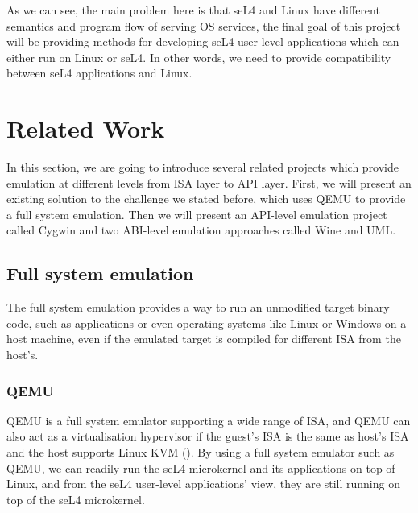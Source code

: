 As we can see, the main problem here is that seL4 and Linux have different semantics and program flow of serving OS services, the final goal of this project will be providing methods for developing seL4 user-level applications which can either run on Linux or seL4. In other words, we need to provide compatibility between seL4 applications and Linux.

\section{Related Work}


In this section, we are going to introduce several related projects which provide emulation at different levels from ISA layer to API layer. First, we will present an existing solution to the challenge we stated before, which uses QEMU to provide a full system emulation. Then we will present an API-level emulation project called Cygwin and two ABI-level emulation approaches called Wine and UML. 

\subsection{Full system emulation}

The full system emulation provides a way to run an unmodified target binary code, such as applications or even operating systems like Linux or Windows on a host machine, even if the emulated target is compiled for different ISA from the host's.

\subsubsection{QEMU}


QEMU is a full system emulator supporting a wide range of ISA, and QEMU can also act as a virtualisation hypervisor if the guest's ISA is the same as host's ISA and the host supports Linux KVM (\cite{enwikiqemu}). By using a full system emulator such as QEMU, we can readily run the seL4 microkernel and its applications on top of Linux, and from the seL4 user-level applications' view, they are still running on top of the seL4 microkernel. 

